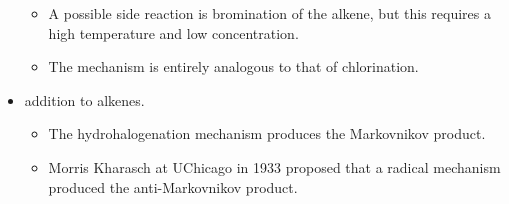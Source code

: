 \documentclass[../notes.tex]{subfiles}
\begin{document}
\begin{itemize}
    \begin{itemize}
        \item A possible side reaction is bromination of the alkene, but this requires a high temperature and low concentration.
        \item The mechanism is entirely analogous to that of chlorination.
    \end{itemize}
    \item {} addition to alkenes.
    \begin{itemize}
        \item The hydrohalogenation mechanism produces the Markovnikov product.
        \item Morris Kharasch at UChicago in 1933 proposed that a radical mechanism produced the anti-Markovnikov product.
        \begin{itemize}

\end{itemize}
\end{itemize}
\end{itemize}
\end{document}
